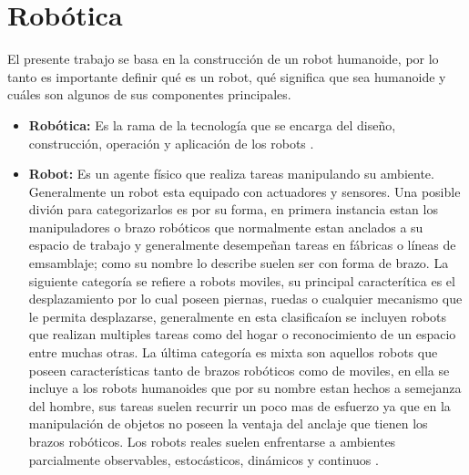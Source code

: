 \section{Robótica} \label{sect:robotica}
 
El presente trabajo se basa en la construcción de un robot humanoide, por lo tanto es importante definir qué es un robot, qué significa que sea humanoide y cuáles son algunos de sus componentes principales.

\begin{itemize}
\item{\textbf{Robótica:} Es la rama de la tecnología que se encarga del diseño, construcción, operación y aplicación de los robots \cite{oxfordRobotics}}.

\item{\textbf{Robot:} Es un agente f\'isico que realiza tareas manipulando su ambiente.
Generalmente un robot esta equipado con actuadores y sensores. Una posible divi\'on para categorizarlos es por su forma, en primera instancia estan los manipuladores o brazo rob\'oticos que normalmente estan anclados a su espacio de trabajo y generalmente desempeñan tareas en f\'abricas o l\'ineas de emsamblaje; como su nombre lo describe suelen ser con forma de brazo. La siguiente categor\'ia se refiere a robots moviles, su principal caracter\'itica es el desplazamiento por lo cual poseen piernas, ruedas o cualquier mecanismo que le permita desplazarse, generalmente en esta clasifica\'ion se incluyen robots que realizan multiples tareas como del hogar o reconocimiento de un espacio entre muchas otras. La \'ultima categor\'ia es mixta son aquellos robots que poseen caracter\'isticas tanto de brazos rob\'oticos como de moviles, en ella se incluye a los robots humanoides que por su nombre estan hechos a semejanza del hombre, sus tareas suelen recurrir un poco mas de esfuerzo ya que en la manipulaci\'on de objetos no poseen la ventaja del anclaje que tienen los brazos rob\'oticos. Los robots reales suelen enfrentarse a ambientes parcialmente observables, estoc\'asticos, din\'amicos y continuos  \cite{peterAndNorvig}.}



\end{itemize}
